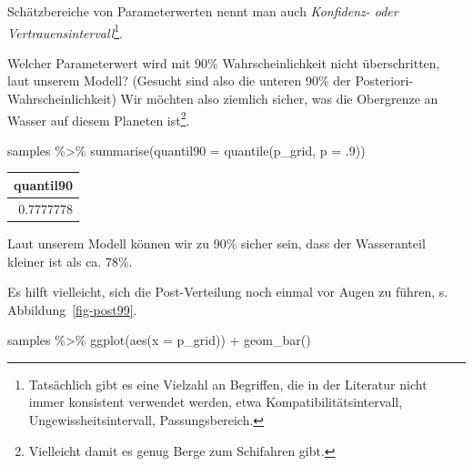 \documentclass[
  a4paper,
  DIV=11]{scrreprt}
\newenvironment{Shaded}{\begin{snugshade}}{\end{snugshade}}
\newcommand{\AttributeTok}[1]{\textcolor[rgb]{0.40,0.45,0.13}{#1}}
\newcommand{\DecValTok}[1]{\textcolor[rgb]{0.68,0.00,0.00}{#1}}
\newcommand{\FunctionTok}[1]{\textcolor[rgb]{0.28,0.35,0.67}{#1}}
\newcommand{\NormalTok}[1]{\textcolor[rgb]{0.00,0.23,0.31}{#1}}
\newcommand{\SpecialCharTok}[1]{\textcolor[rgb]{0.37,0.37,0.37}{#1}}
\theoremstyle{definition}
\theoremstyle{remark}
\begin{document}
\begin{tcolorbox}[enhanced jigsaw, title=\textcolor{quarto-callout-important-color}{\faExclamation}\hspace{0.5em}{Wichtig}, bottomtitle=1mm, bottomrule=.15mm, titlerule=0mm, colbacktitle=quarto-callout-important-color!10!white, colframe=quarto-callout-important-color-frame, leftrule=.75mm, left=2mm, toprule=.15mm, colback=white, arc=.35mm, breakable, toptitle=1mm, opacityback=0, rightrule=.15mm, coltitle=black, opacitybacktitle=0.6]

Schätzbereiche von Parameterwerten nennt man auch \emph{Konfidenz- oder
Vertrauensintervall}\footnote{Tatsächlich gibt es eine Vielzahl an
  Begriffen, die in der Literatur nicht immer konsistent verwendet
  werden, etwa Kompatibilitätsintervall, Ungewissheitsintervall,
  Passungsbereich.}.

\end{tcolorbox}

Welcher Parameterwert wird mit 90\% Wahrscheinlichkeit nicht
überschritten, laut unserem Modell? (Gesucht sind also die unteren 90\%
der Posteriori-Wahrscheinlichkeit) Wir möchten also ziemlich sicher, was
die Obergrenze an Wasser auf diesem Planeten ist\footnote{Vielleicht
  damit es genug Berge zum Schifahren gibt.}.

\begin{Shaded}
\begin{Highlighting}[]
\NormalTok{samples }\SpecialCharTok{\%\textgreater{}\%} 
  \FunctionTok{summarise}\NormalTok{(}\AttributeTok{quantil90 =} \FunctionTok{quantile}\NormalTok{(p\_grid, }\AttributeTok{p =}\NormalTok{ .}\DecValTok{9}\NormalTok{))}
\end{Highlighting}
\end{Shaded}

\begin{longtable}[]{@{}r@{}}
\toprule()
quantil90 \\
\midrule()
\endhead
0.7777778 \\
\bottomrule()
\end{longtable}

Laut unserem Modell können wir zu 90\% sicher sein, dass der
Wasseranteil kleiner ist als ca. 78\%.

Es hilft vielleicht, sich die Post-Verteilung noch einmal vor Augen zu
führen, s. Abbildung~\ref{fig-post99}.

\begin{Shaded}
\begin{Highlighting}[]
\NormalTok{samples }\SpecialCharTok{\%\textgreater{}\%} 
  \FunctionTok{ggplot}\NormalTok{(}\FunctionTok{aes}\NormalTok{(}\AttributeTok{x =}\NormalTok{ p\_grid)) }\SpecialCharTok{+}
  \FunctionTok{geom\_bar}\NormalTok{()}
\end{Highlighting}
\end{Shaded}
\end{document}
